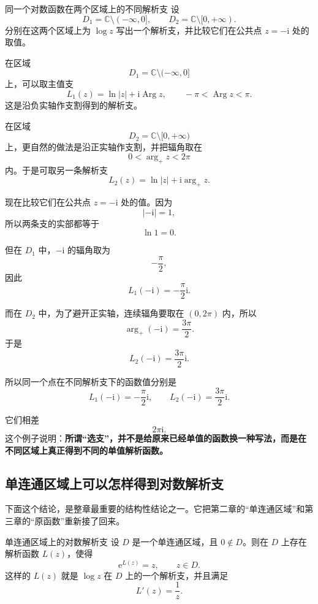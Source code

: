 \begin{lizi}{同一个对数函数在两个区域上的不同解析支}{}
设
\[
    D_1=\mathbb{C}\setminus(-\infty,0],
    \qquad
    D_2=\mathbb{C}\setminus[0,+\infty).
\]
分别在这两个区域上为 $\log z$ 写出一个解析支，并比较它们在公共点 $z=-\mathrm{i}$ 处的取值。

\begin{jie}
在区域
\[
    D_1=\mathbb{C}\setminus(-\infty,0]
\]
上，可以取主值支
\[
    L_1(z)=\ln|z|+\mathrm{i}\operatorname{Arg} z,
    \qquad -\pi<\operatorname{Arg} z<\pi.
\]
这是沿负实轴作支割得到的解析支。

在区域
\[
    D_2=\mathbb{C}\setminus[0,+\infty)
\]
上，更自然的做法是沿正实轴作支割，并把辐角取在
\[
    0<\arg_+ z<2\pi
\]
内。于是可取另一条解析支
\[
    L_2(z)=\ln|z|+\mathrm{i}\arg_+ z.
\]

现在比较它们在公共点 $z=-\mathrm{i}$ 处的值。因为
\[
    |-\mathrm{i}|=1,
\]
所以两条支的实部都等于
\[
    \ln 1=0.
\]

但在 $D_1$ 中，$-\mathrm{i}$ 的辐角取为
\[
    -\frac{\pi}{2},
\]
因此
\[
    L_1(-\mathrm{i})=-\frac{\pi}{2}\mathrm{i}.
\]

而在 $D_2$ 中，为了避开正实轴，连续辐角要取在 $(0,2\pi)$ 内，所以
\[
    \arg_+(-\mathrm{i})=\frac{3\pi}{2}.
\]
于是
\[
    L_2(-\mathrm{i})=\frac{3\pi}{2}\mathrm{i}.
\]

所以同一个点在不同解析支下的函数值分别是
\[
    L_1(-\mathrm{i})=-\frac{\pi}{2}\mathrm{i},
    \qquad
    L_2(-\mathrm{i})=\frac{3\pi}{2}\mathrm{i}.
\]

它们相差
\[
    2\pi\mathrm{i}.
\]
这个例子说明：\textbf{所谓``选支''，并不是给原来已经单值的函数换一种写法，而是在不同区域上真正得到不同的单值解析函数。}
\end{jie}
\end{lizi}

\subsection{单连通区域上可以怎样得到对数解析支}

下面这个结论，是整章最重要的结构性结论之一。它把第二章的``单连通区域''和第三章的``原函数''重新接了回来。

\begin{dingli}{单连通区域上的对数解析支}{}
设 $D$ 是一个单连通区域，且 $0\notin D$。则在 $D$ 上存在解析函数 $L(z)$，使得
\[
    \mathrm{e}^{L(z)}=z,\qquad z\in D.
\]
这样的 $L(z)$ 就是 $\log z$ 在 $D$ 上的一个解析支，并且满足
\[
    L'(z)=\frac{1}{z}.
\]
\end{dingli}

